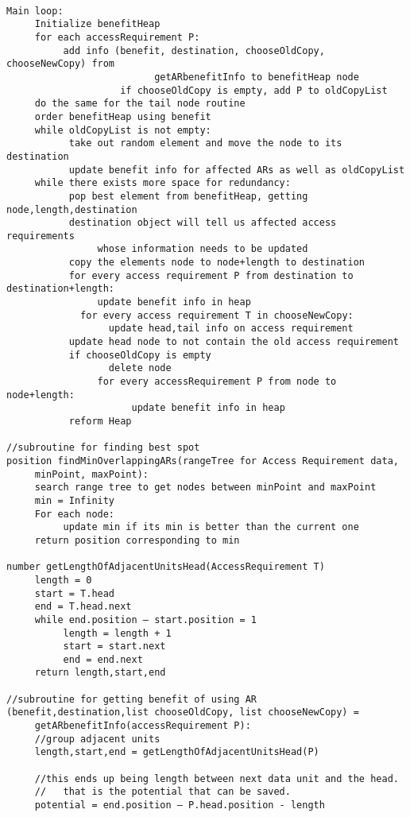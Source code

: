 \documentclass[11pt,psfig]{article}
\begin{document}
\begin{verbatim}

Main loop:
     Initialize benefitHeap
     for each accessRequirement P:
          add info (benefit, destination, chooseOldCopy, chooseNewCopy) from   
					      getARbenefitInfo to benefitHeap node
					if chooseOldCopy is empty, add P to oldCopyList
     do the same for the tail node routine
     order benefitHeap using benefit
     while oldCopyList is not empty:
           take out random element and move the node to its destination
           update benefit info for affected ARs as well as oldCopyList
     while there exists more space for redundancy:
           pop best element from benefitHeap, getting node,length,destination
           destination object will tell us affected access requirements 
                whose information needs to be updated
           copy the elements node to node+length to destination
           for every access requirement P from destination to destination+length:
                update benefit info in heap
	         for every access requirement T in chooseNewCopy:
	              update head,tail info on access requirement
           update head node to not contain the old access requirement
           if chooseOldCopy is empty
	              delete node
                for every accessRequirement P from node to node+length:
                      update benefit info in heap
           reform Heap

//subroutine for finding best spot
position findMinOverlappingARs(rangeTree for Access Requirement data, 
     minPoint, maxPoint):
     search range tree to get nodes between minPoint and maxPoint
     min = Infinity
     For each node:
          update min if its min is better than the current one
     return position corresponding to min

number getLengthOfAdjacentUnitsHead(AccessRequirement T)
     length = 0
     start = T.head
     end = T.head.next
     while end.position – start.position = 1 
          length = length + 1
          start = start.next
          end = end.next
     return length,start,end

//subroutine for getting benefit of using AR
(benefit,destination,list chooseOldCopy, list chooseNewCopy) = 
     getARbenefitInfo(accessRequirement P):
     //group adjacent units
     length,start,end = getLengthOfAdjacentUnitsHead(P)
	
     //this ends up being length between next data unit and the head. 
     //   that is the potential that can be saved.
     potential = end.position – P.head.position - length


\end{verbatim}
\end{document}
